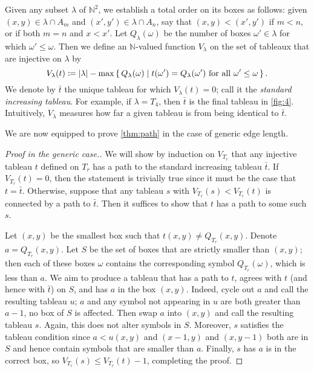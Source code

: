 \documentclass[11pt,reqno]{amsart}
\newcommand*{\N}{\mathbb{N}}
\newcommand*{\abs}[1]{{\lvert #1 \rvert}}
\newcommand*{\given}{\mid}
\newcommand*{\maps}{\nobreak\mskip2mu\mathpunct{}\nonscript
  \mkern-\thinmuskip{:}\mskip6muplus1mu\relax}
\newcommand*{\card}[1]{\abs{#1}}
\newcommand{\caelan}[1]{\textcolor{orange}{\sf C: [#1]}}
\theoremstyle{definition}
\theoremstyle{problem}
\theoremstyle{plain}
\theoremstyle{remark}
\theoremstyle{theorem}
\numberwithin{equation}{section}
\numberwithin{figure}{section}
\begin{document}
Given any subset $\lambda$ of $\N^2$, we establish a total order on
its boxes as follows: given $(x,y) \in \lambda \cap A_m$ and
$(x',y') \in \lambda \cap A_n$, say that $(x,y) < (x',y')$ if $m < n$,
or if both $m = n$ and $x < x'$.  Let $Q_{\lambda}(\omega)$ be the
number of boxes $\omega' \in \lambda$ for which $\omega' \leq \omega$.
Then we define an $\N$-valued function $V_{\lambda}$ on the set of
tableaux that are injective on $\lambda$ by
\begin{equation*}
  V_{\lambda}(t) \coloneq \card{\lambda} - \max \set{Q_{\lambda}(\omega)
    \given t(\omega') = Q_{\lambda}(\omega') \text{ for all }
    \omega' \leq \omega}.
\end{equation*}
We denote by $\bar{t}$ the unique tableau for which
$V_{\lambda}(t) = 0$; call it the \textit{standard increasing
  tableau}.  For example, if $\lambda = T_4$, then $\bar{t}$ is the
final tableau in \cref{fig:4}.  Intuitively, $V_{\lambda}$ measures
how far a given tableau is from being identical to $\bar{t}$.

We are now equipped to prove \cref{thm:path} in the case of generic
edge length.

\begin{proof}[Proof in the generic case.]
  We will show by induction on $V_{T_r}$ that any injective tableau
  $t$ defined on $T_r$ has a path to the standard increasing tableau
  $\bar{t}$.  If $V_{T_r}(t) = 0$, then the statement is trivially
  true since it must be the case that $t = \bar{t}$.  Otherwise,
  suppose that any tableau $s$ with $V_{T_r}(s) < V_{T_r}(t)$ is
  connected by a path to $\bar{t}$.  Then it suffices to show that $t$
  has a path to some such $s$.
  
  Let $(x,y)$ be the smallest box such that
  $t(x,y) \neq Q_{T_r}(x,y)$.  Denote $a =Q_{T_r}(x,y)$.  Let $S$ be
  the set of boxes that are strictly smaller than $(x,y)$; then each
  of these boxes $\omega$ contains the corresponding symbol
  $Q_{T_r}(\omega)$, which is less than $a$.  We aim to produce a
  tableau that has a path to $t$, agrees with $t$ (and hence with
  $\bar{t}$) on $S$, and has $a$ in the box $(x,y)$.  Indeed, cycle
  out $a$ and call the resulting tableau $u$; $a$ and any symbol not
  appearing in $u$ are both greater than $a - 1$, no box of $S$ is
  affected.  Then swap $a$ into $(x,y)$ and call the resulting tableau
  $s$.  Again, this does not alter symbols in $S$.  Moreover, $s$
  satisfies the tableau condition since $a < u(x,y)$ and $(x-1,y)$ and
  $(x,y-1)$ both are in $S$ and hence contain symbols that are smaller
  than $a$.  Finally, $s$ has $a$ is in the correct box, so
  $V_{T_r}(s) \leq V_{T_r}(t) - 1$, completing the proof.
\end{proof}
\end{document}
